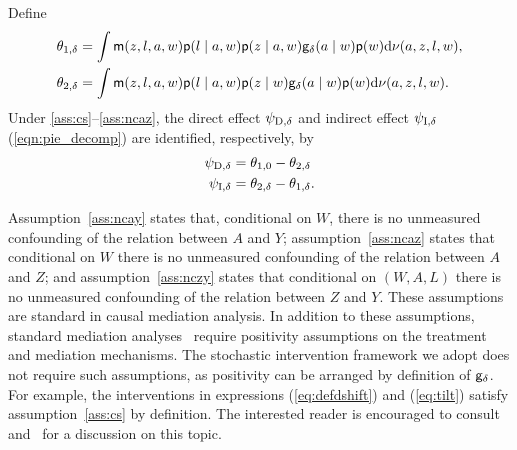 
\begin{theorem}[Identification]\label{theo:iden}
  Define
  \begin{align*}
    \theta_{1,\delta} &= \int \mathsf{m}(z,l,a,w)\mathsf{p}(l\mid a,w)\mathsf{p}(z\mid a,w)
        \mathsf{g}_\delta(a \mid w)\mathsf{p}(w)\mathrm{d}\nu(a,z,l,w),\\
    \theta_{2,\delta} &=  \int \mathsf{m}(z,l,a,w)\mathsf{p}(l\mid a,w)\mathsf{p}(z\mid w)
        \mathsf{g}_\delta(a \mid w)\mathsf{p}(w)\mathrm{d}\nu(a,z,l,w).
  \end{align*}
  Under \ref{ass:cs}--\ref{ass:ncaz}, the direct effect $\psi_{\mbox{\scriptsize D}, \delta}$ and indirect
  effect $\psi_{\mbox{\scriptsize I}, \delta}$ (\ref{eqn:pie_decomp}) are identified, respectively, by
\begin{equation}
  \begin{split}
    \psi_{\mbox{\scriptsize D}, \delta} & = \theta_{1,0} - \theta_{2,\delta}\\
    \psi_{\mbox{\scriptsize I}, \delta} & = \theta_{2,\delta} -\theta_{1,\delta}.
    \end{split}\label{eq:defpsi}
\end{equation}
\end{theorem}

Assumption~\ref{ass:ncay} states that, conditional on $W$, there is no
unmeasured confounding of the relation between $A$ and $Y$;
assumption~\ref{ass:ncaz} states that conditional on $W$ there is no unmeasured
confounding of the relation between $A$ and $Z$; and assumption~\ref{ass:nczy}
states that conditional on $(W,A,L)$ there is no unmeasured confounding of the
relation between $Z$ and $Y$. These assumptions are standard in causal mediation
analysis. In addition to these assumptions, standard mediation
analyses~\citep[e.g., ][]{vanderweele2014effect} require positivity assumptions
on the treatment and mediation mechanisms. The stochastic intervention framework
we adopt does not require such assumptions, as positivity can be arranged by
definition of $\mathsf{g}_\delta$. For example, the interventions in expressions
(\ref{eq:defdshift}) and (\ref{eq:tilt}) satisfy assumption~\ref{ass:cs} by
definition. The interested reader is encouraged to
consult~\cite{kennedy2019nonparametric} and~\cite{diaz2020causal} for
a discussion on this topic.


